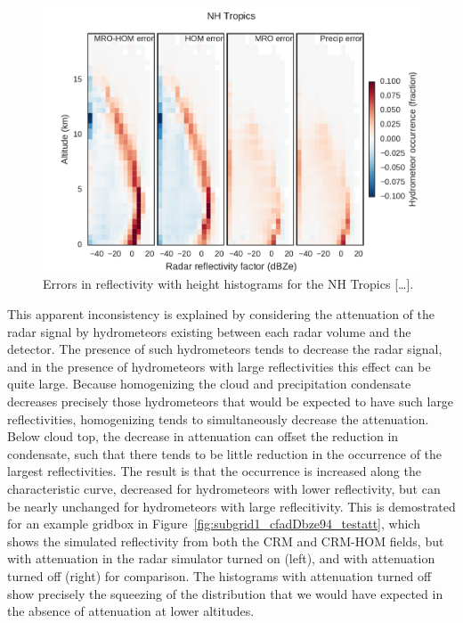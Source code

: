 \begin{figure}[htbp]
\centering
\includegraphics{graphics/subgrid1_cfadDbze94_NHTropics_diff.pdf}
\caption{\label{fig:subgrid1_cfadDbze94_tropics_diff}Errors in
reflectivity with height histograms for the NH Tropics
{[}\ldots{}{]}.}\label{fig:subgrid1ux5fcfadDbze94ux5ftropicsux5fdiff}
\end{figure}

This apparent inconsistency is explained by considering the attenuation
of the radar signal by hydrometeors existing between each radar volume
and the detector. The presence of such hydrometeors tends to decrease
the radar signal, and in the presence of hydrometeors with large
reflectivities this effect can be quite large. Because homogenizing the
cloud and precipitation condensate decreases precisely those
hydrometeors that would be expected to have such large reflectivities,
homogenizing tends to simultaneously decrease the attenuation. Below
cloud top, the decrease in attenuation can offset the reduction in
condensate, such that there tends to be little reduction in the
occurrence of the largest reflectivities. The result is that the
occurrence is increased along the characteristic curve, decreased for
hydrometeors with lower reflectivity, but can be nearly unchanged for
hydrometeors with large reflecitivity. This is demostrated for an
example gridbox in Figure~\ref{fig:subgrid1_cfadDbze94_testatt}, which
shows the simulated reflectivity from both the CRM and CRM-HOM fields,
but with attenuation in the radar simulator turned on (left), and with
attenuation turned off (right) for comparison. The histograms with
attenuation turned off show precisely the squeezing of the distribution
that we would have expected in the absence of attenuation at lower
altitudes.

